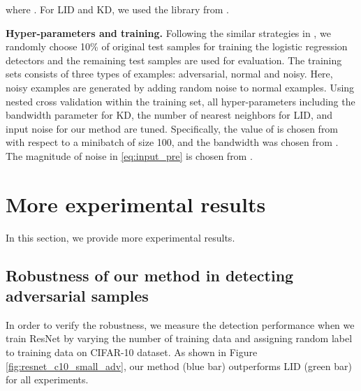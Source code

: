 \documentclass{article}
\begin{document}
where .
For LID and KD, we used the library from \citet{ma2018characterizing}.

{\bf Hyper-parameters and training.} Following the similar strategies in \citep{feinman2017detecting, ma2018characterizing},
we randomly choose 10\% of original test samples for training the logistic regression detectors and the remaining test samples are used for evaluation.
The training sets consists of three types of examples: adversarial, normal and noisy.
Here, noisy examples are generated by adding random noise to normal examples.
Using nested cross validation within the training set, all hyper-parameters including the bandwidth parameter for KD, the number of nearest neighbors for LID, and input noise for our method are tuned. 
Specifically, the value of  is chosen from  with respect to a minibatch of size 100, and the bandwidth was chosen from .
The magnitude of noise in \eqref{eq:input_pre} is chosen from . 

\section{More experimental results} \label{appendix:exp_results}

In this section, we provide more experimental results.


\subsection{Robustness of our method in detecting adversarial samples} \label{appendix:robust_lid}

In order to verify the robustness, we measure the detection performance when we train ResNet by varying the number of training data and assigning random label to training data on CIFAR-10 dataset. As shown in Figure \ref{fig:resnet_c10_small_adv}, our method (blue bar) outperforms LID (green bar) for all experiments.
\end{document}
